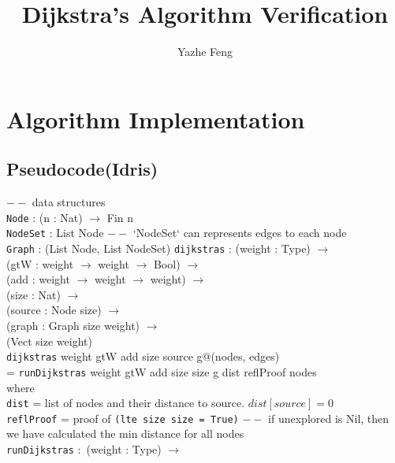 \documentclass[11pt, oneside]{article}   	%
\title{Dijkstra's Algorithm Verification}
\author{Yazhe Feng}
\newcommand\tab[1][1cm]{\hspace*{#1}}
\begin{document}
\maketitle

\section{Algorithm Implementation}

\subsection{Pseudocode(Idris)}

$--$ data structures
\\
\texttt{Node} : (n : Nat) $\rightarrow$ Fin n
\\
\texttt{NodeSet} : List Node \tab $--$ `NodeSet` can represents edges to each node
\\
\texttt{Graph} : (List Node, List NodeSet)
\newline\newline
\texttt{dijkstras} :  (weight : Type) $\rightarrow$ \\
                \tab\tab (gtW : weight $\rightarrow$ weight $\rightarrow$ Bool) $\rightarrow$ \\
            	\tab\tab(add : weight $\rightarrow$ weight $\rightarrow$ weight) $\rightarrow$ \\
            	\tab\tab(size : Nat) $\rightarrow$ \\
            	\tab\tab(source : Node size) $\rightarrow$ \\
            	\tab\tab(graph : Graph size weight) $\rightarrow$ \\
            	\tab\tab(Vect size weight)\\
\texttt{dijkstras} weight gtW add size source g@(nodes, edges) \\
\tab  = \texttt{runDijkstras} weight gtW add size size g dist reflProof nodes \\
\tab\tab where \\
\tab\tab\tab \texttt{dist} = list of nodes and their distance to source. $dist[source] = 0$\\
\tab\tab\tab \texttt{reflProof} = proof of \texttt{(lte size size = True)}
\newline\newline
$--$ if unexplored is Nil, then we have calculated the min distance for all nodes\\
\texttt{runDijkstras} $:$ (weight : Type) $\rightarrow$ \\
\end{document}
